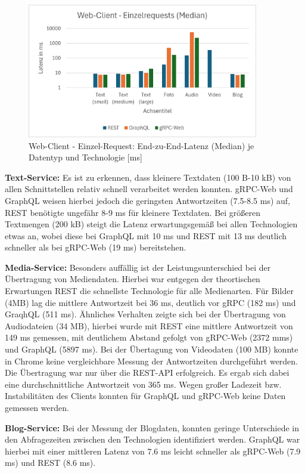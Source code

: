 \clearpage

\begin{figure}[htbp]
	\centering
	\includegraphics[width=0.9\textwidth]{images/Webclient.png}
	\caption{Web-Client - Einzel-Request: End-zu-End-Latenz (Median) je Datentyp und Technologie [ms]}
	\label{fig:webclient-single-median}
\end{figure}

\textbf{Text-Service:}  
Es ist zu erkennen, dass kleinere Textdaten (100 B-10 kB) von allen Schnittstellen relativ schnell verarbeitet werden konnten. gRPC-Web und GraphQL weisen hierbei jedoch die geringsten Antwortzeiten (7.5-8.5 ms) auf, REST benötigte ungefähr 8-9 ms für kleinere Textdaten. Bei größeren Textmengen (200 kB) steigt die Latenz erwartungsgemäß bei allen Technologien etwas an, wobei diese bei GraphQL mit 10 ms und REST mit 13 ms deutlich schneller als bei gRPC-Web (19 ms) bereitstehen. 

\textbf{Media-Service:}  
Besonders auffällig ist der Leistungsunterschied bei der Übertragung von Mediendaten.
Hierbei war entgegen der theortischen Erwartungen REST die schnellste Technologie für alle Medienarten. Für Bilder (4MB) lag die mittlere Antwortzeit bei 36 ms, deutlich vor gRPC (182 ms) und GraqhQL (511 ms).
Ähnliches Verhalten zeigte sich bei der Übertragung von Audiodateien (34 MB), hierbei wurde mit REST eine mittlere Antwortzeit von 149 ms gemessen, mit deutlichem Abstand gefolgt von gRPC-Web (2372 mms) und GraphQL (5897  ms).
Bei der Übertagung von Videodaten (100 MB) konnte in Chrome keine vergleichbare Messung der Antwortzeiten durchgeführt werden. Die Übertragung war nur über die REST-API erfolgreich. Es ergab sich dabei eine durchschnittliche Antwortzeit von 365 ms. Wegen großer Ladezeit bzw. Instabilitäten des Clients konnten für GraphQL und gRPC-Web keine Daten gemessen werden. 


\textbf{Blog-Service:}  
Bei der Messung der Blogdaten, konnten geringe Unterschiede in den Abfragezeiten zwischen den Technologien identifiziert werden. GraphQL war hierbei mit einer mittleren Latenz von 7.6 ms leicht schneller als gRPC-Web (7.9 ms) und REST (8.6 ms).

